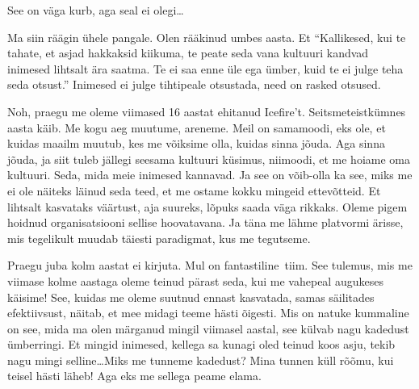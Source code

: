 See on väga kurb, aga seal ei olegi\ldots 

Ma siin räägin ühele pangale. Olen rääkinud umbes aasta. Et 
\enquote{Kallikesed, kui te tahate, et asjad hakkaksid kiikuma, te peate seda 
vana kultuuri kandvad inimesed lihtsalt ära saatma. Te ei saa enne üle ega 
ümber, kuid te ei julge teha seda otsust.} Inimesed ei julge tihtipeale 
otsustada, need on rasked otsused. 


Noh, praegu me oleme viimased 16 aastat ehitanud Icefire't. Seitsmeteistkümnes 
aasta käib. Me kogu aeg muutume, areneme. Meil on samamoodi, eks ole, et kuidas 
maailm muutub, kes me võiksime olla, kuidas sinna jõuda. Aga  sinna jõuda, ja 
siit tuleb jällegi seesama kultuuri küsimus, niimoodi, et  me hoiame oma 
kultuuri. Seda, mida meie inimesed kannavad. Ja see on võib-olla ka see, miks 
me ei ole näiteks läinud seda teed, et me ostame kokku mingeid  ettevõtteid. Et 
lihtsalt kasvataks väärtust, aja suureks, lõpuks saada väga rikkaks. Oleme 
pigem hoidnud organisatsiooni sellise hoovatavana. Ja täna me lähme platvormi 
ärisse, mis tegelikult muudab täiesti paradigmat, kus me tegutseme. 


Praegu juba kolm aastat ei kirjuta. Mul on fantastiline tiim. See tulemus, mis 
me viimase kolme aastaga oleme teinud pärast seda, kui me vahepeal augukeses 
käisime! See, kuidas me oleme suutnud ennast kasvatada, samas säilitades 
efektiivsust, näitab, et mee midagi teeme hästi õigesti. Mis on natuke 
kummaline on see, mida ma olen märganud mingil viimasel aastal, see külvab nagu 
kadedust ümberringi. Et mingid inimesed, kellega sa  kunagi oled teinud koos 
asju, tekib nagu mingi selline\ldots Miks me tunneme kadedust? Mina tunnen küll 
rõõmu, kui teisel hästi läheb! Aga eks me sellega peame  elama. 